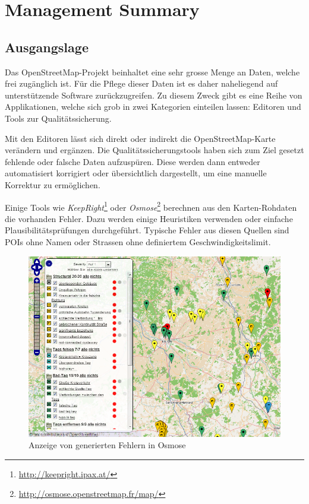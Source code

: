 \chapter*{Management Summary}
\thispagestyle{scrheadings}


\section*{Ausgangslage}
Das \gls{OpenStreetMap}-Projekt beinhaltet eine sehr grosse Menge an Daten, welche frei zugänglich ist.
Für die Pflege dieser Daten ist es daher naheliegend auf unterstützende Software zurückzugreifen.
Zu diesem Zweck gibt es eine Reihe von Applikationen, welche sich grob in zwei Kategorien einteilen lassen:
Editoren und Tools zur Qualitätssicherung.

Mit den Editoren lässt sich direkt oder indirekt die \gls{OpenStreetMap}-Karte verändern und ergänzen.
Die Qualitätssicherungstools haben sich zum Ziel gesetzt fehlende oder falsche Daten aufzuspüren.
Diese werden dann entweder automatisiert korrigiert oder übersichtlich dargestellt, um eine manuelle Korrektur zu ermöglichen.

Einige Tools wie \emph{KeepRight}\footnote{\url{http://keepright.ipax.at/}} oder \emph{Osmose}\footnote{\url{http://osmose.openstreetmap.fr/map/}} berechnen aus den Karten-Rohdaten die vorhanden Fehler.
Dazu werden einige Heuristiken verwenden oder einfache Plausibilitätsprüfungen durchgeführt.
Typische Fehler aus diesen Quellen sind \glspl{POI} ohne Namen oder Strassen ohne definiertem Geschwindigkeitslimit.

\begin{figure}[H]
	\centering
	\includegraphics[scale=0.4]{images/managementsummary/osmose-screenshot}
	\caption{Anzeige von generierten Fehlern in Osmose}
	\label{image-osmose-screenshot}
\end{figure}

